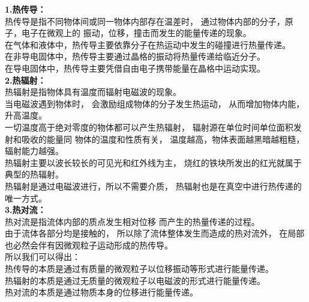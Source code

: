 \documentclass[UTF8]{ctexart}
\begin{document}
    \textbf{1.热传导：}\\[2mm]
    热传导是指不同物体间或同一物体内部存在温差时，
    通过物体内部的分子，原子，电子在微观上的
    振动，位移，撞击而发生的能量传递的现象。\\[5mm]
    在气体和液体中，热传导主要依靠分子在热运动中发生的碰撞进行热量传递。\\[1mm]
    在非导电固体中，热传导主要通过晶格的振动将热量传递给临近分子。\\[1mm]
    在导电固体中，热传导主要凭借自由电子携带能量在晶格中运动实现。\\[8mm]
    \textbf{2.热辐射：}\\[2mm]
    热辐射是指物体具有温度而辐射电磁波的现象。\\[3mm]
    当电磁波遇到物体时，
    会激励组成物体的分子发生热运动，
    从而增加物体内能，升高温度。\\[3mm]
    一切温度高于绝对零度的物体都可以产生热辐射，
    辐射源在单位时间单位面积发射和吸收的能量同
    物体的温度和性质有关，
    温度越高，物体表面越黑暗越粗糙，辐射能力越强。\\[3mm]
    热辐射主要以波长较长的可见光和红外线为主，
    烧红的铁块所发出的红光就属于典型的热辐射。\\[3mm]
    热辐射是通过电磁波进行，所以不需要介质，
    热辐射也是在真空中进行热传递的唯一方式。\\[8mm]
    \textbf{3.热对流：}\\[2mm]
    热对流是指流体内部的质点发生相对位移
    而产生的热量传递的过程。\\[3mm]
    由于流体各部分均是接触的，
    所以除了流体整体发生而造成的热对流外，
    在局部也必然会伴有因微观粒子运动形成的热传导。\\[12mm]
    所以我们可以得出：\\[3mm]
    热传导的本质是通过有质量的微观粒子以位移振动等形式进行能量传递。\\[3mm]
    热辐射的本质是通过无质量的微观粒子以电磁波的形式进行能量传递。\\[3mm]
    热对流的本质是通过物质本身的位移进行能量传递。\\[3mm]

\newpage
\end{document}
